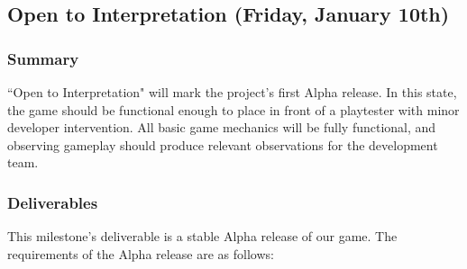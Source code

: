 \subsection{Open to Interpretation (Friday, January 10th)}

\subsubsection*{Summary}
``Open to Interpretation" will mark the project's first Alpha release. In this state, the game 
should be functional enough to place in front of a playtester with minor developer 
intervention. All basic game mechanics will be fully functional, and observing gameplay 
should produce relevant observations for the development team.

\subsubsection*{Deliverables}
This milestone’s deliverable is a stable Alpha release of our game. The requirements of the 
Alpha release are as follows:

